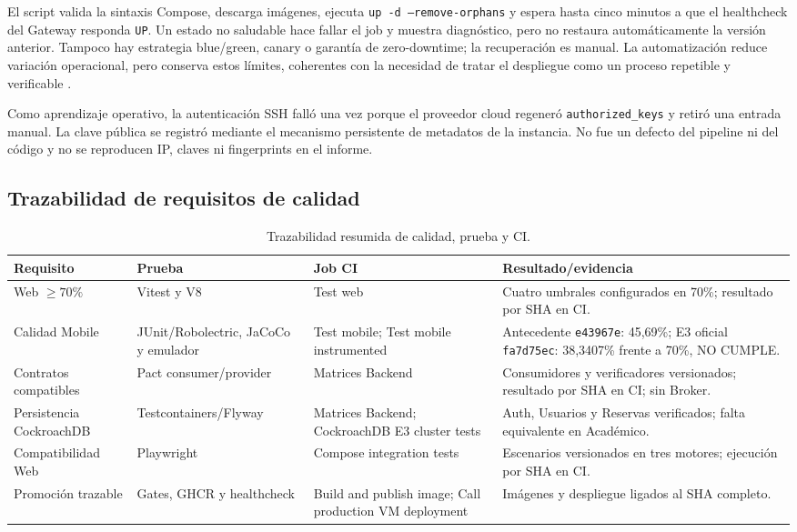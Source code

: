 El script valida la sintaxis Compose, descarga imágenes, ejecuta
\texttt{up -d --remove-orphans} y espera hasta cinco minutos a que el healthcheck
del Gateway responda \texttt{UP}. Un estado no saludable hace fallar el job y
muestra diagnóstico, pero no restaura automáticamente la versión anterior. Tampoco
hay estrategia blue/green, canary o garantía de zero-downtime; la recuperación
es manual. La automatización reduce variación operacional, pero conserva estos
límites, coherentes con la necesidad de tratar el despliegue como un proceso
repetible y verificable \cite{farley2021modernsoftwareengineering}.

Como aprendizaje operativo, la autenticación SSH falló una vez porque el
proveedor cloud regeneró \texttt{authorized\_keys} y retiró una entrada manual.
La clave pública se registró mediante el mecanismo persistente de metadatos de la
instancia. No fue un defecto del pipeline ni del código y no se reproducen IP,
claves ni fingerprints en el informe.

\subsection{Trazabilidad de requisitos de calidad}
\label{subsec:trazabilidad-pruebas}

\begin{table}[ht]
  \centering
  \small
  \caption{Trazabilidad resumida de calidad, prueba y CI.}
  \label{tab:trazabilidad-pruebas}
  \begin{tabular}{|p{3.1cm}|p{3.1cm}|p{3.2cm}|p{4.0cm}|}
    \hline
    \textbf{Requisito} & \textbf{Prueba} & \textbf{Job CI} & \textbf{Resultado/evidencia} \\
    \hline
    Web $\geq 70\%$ & Vitest y V8 & Test web & Cuatro umbrales configurados en 70\%; resultado por SHA en CI. \\
    \hline
    Calidad Mobile & JUnit/Robolectric, JaCoCo y emulador & Test mobile; Test mobile instrumented & Antecedente \texttt{e43967e}: 45,69\%; E3 oficial \texttt{fa7d75ec}: 38,3407\% frente a 70\%, NO CUMPLE. \\
    \hline
    Contratos compatibles & Pact consumer/provider & Matrices Backend & Consumidores y verificadores versionados; resultado por SHA en CI; sin Broker. \\
    \hline
    Persistencia CockroachDB & Testcontainers/Flyway & Matrices Backend; CockroachDB E3 cluster tests & Auth, Usuarios y Reservas verificados; falta equivalente en Académico. \\
    \hline
    Compatibilidad Web & Playwright & Compose integration tests & Escenarios versionados en tres motores; ejecución por SHA en CI. \\
    \hline
    Promoción trazable & Gates, GHCR y healthcheck & Build and publish image; Call production VM deployment & Imágenes y despliegue ligados al SHA completo. \\
    \hline
  \end{tabular}
\end{table}

